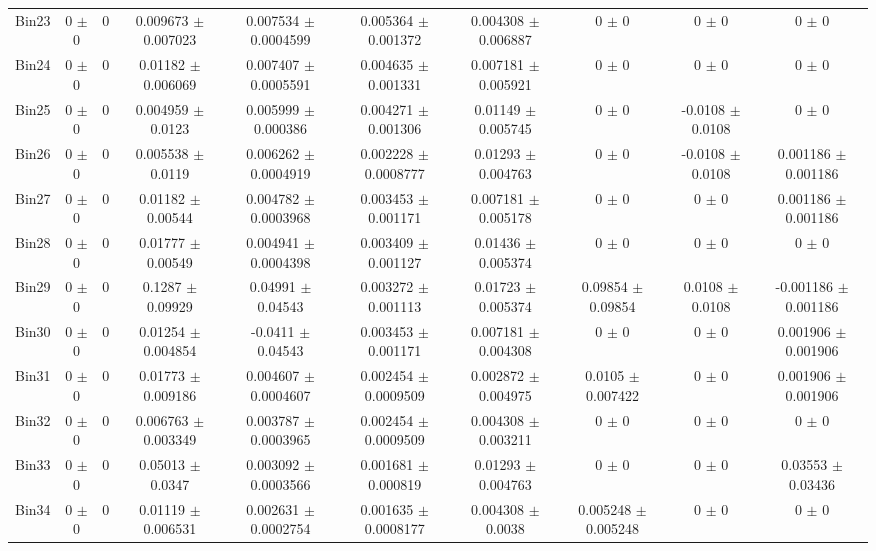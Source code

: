 \begin{tabular}{@{\extracolsep{4pt}}lccccccccc@{}}
     Bin23 & 0 $\pm$ 0 & 0 & 0.009673 $\pm$ 0.007023 & 0.007534 $\pm$ 0.0004599 & 0.005364 $\pm$ 0.001372 & 0.004308 $\pm$ 0.006887 & 0 $\pm$ 0 & 0 $\pm$ 0 & 0 $\pm$ 0 \\ 
     Bin24 & 0 $\pm$ 0 & 0 & 0.01182 $\pm$ 0.006069 & 0.007407 $\pm$ 0.0005591 & 0.004635 $\pm$ 0.001331 & 0.007181 $\pm$ 0.005921 & 0 $\pm$ 0 & 0 $\pm$ 0 & 0 $\pm$ 0 \\ 
     Bin25 & 0 $\pm$ 0 & 0 & 0.004959 $\pm$ 0.0123 & 0.005999 $\pm$ 0.000386 & 0.004271 $\pm$ 0.001306 & 0.01149 $\pm$ 0.005745 & 0 $\pm$ 0 & -0.0108 $\pm$ 0.0108 & 0 $\pm$ 0 \\ 
     Bin26 & 0 $\pm$ 0 & 0 & 0.005538 $\pm$ 0.0119 & 0.006262 $\pm$ 0.0004919 & 0.002228 $\pm$ 0.0008777 & 0.01293 $\pm$ 0.004763 & 0 $\pm$ 0 & -0.0108 $\pm$ 0.0108 & 0.001186 $\pm$ 0.001186 \\ 
     Bin27 & 0 $\pm$ 0 & 0 & 0.01182 $\pm$ 0.00544 & 0.004782 $\pm$ 0.0003968 & 0.003453 $\pm$ 0.001171 & 0.007181 $\pm$ 0.005178 & 0 $\pm$ 0 & 0 $\pm$ 0 & 0.001186 $\pm$ 0.001186 \\ 
     Bin28 & 0 $\pm$ 0 & 0 & 0.01777 $\pm$ 0.00549 & 0.004941 $\pm$ 0.0004398 & 0.003409 $\pm$ 0.001127 & 0.01436 $\pm$ 0.005374 & 0 $\pm$ 0 & 0 $\pm$ 0 & 0 $\pm$ 0 \\ 
     Bin29 & 0 $\pm$ 0 & 0 & 0.1287 $\pm$ 0.09929 & 0.04991 $\pm$ 0.04543 & 0.003272 $\pm$ 0.001113 & 0.01723 $\pm$ 0.005374 & 0.09854 $\pm$ 0.09854 & 0.0108 $\pm$ 0.0108 & -0.001186 $\pm$ 0.001186 \\ 
     Bin30 & 0 $\pm$ 0 & 0 & 0.01254 $\pm$ 0.004854 & -0.0411 $\pm$ 0.04543 & 0.003453 $\pm$ 0.001171 & 0.007181 $\pm$ 0.004308 & 0 $\pm$ 0 & 0 $\pm$ 0 & 0.001906 $\pm$ 0.001906 \\ 
     Bin31 & 0 $\pm$ 0 & 0 & 0.01773 $\pm$ 0.009186 & 0.004607 $\pm$ 0.0004607 & 0.002454 $\pm$ 0.0009509 & 0.002872 $\pm$ 0.004975 & 0.0105 $\pm$ 0.007422 & 0 $\pm$ 0 & 0.001906 $\pm$ 0.001906 \\ 
     Bin32 & 0 $\pm$ 0 & 0 & 0.006763 $\pm$ 0.003349 & 0.003787 $\pm$ 0.0003965 & 0.002454 $\pm$ 0.0009509 & 0.004308 $\pm$ 0.003211 & 0 $\pm$ 0 & 0 $\pm$ 0 & 0 $\pm$ 0 \\ 
     Bin33 & 0 $\pm$ 0 & 0 & 0.05013 $\pm$ 0.0347 & 0.003092 $\pm$ 0.0003566 & 0.001681 $\pm$ 0.000819 & 0.01293 $\pm$ 0.004763 & 0 $\pm$ 0 & 0 $\pm$ 0 & 0.03553 $\pm$ 0.03436 \\ 
     Bin34 & 0 $\pm$ 0 & 0 & 0.01119 $\pm$ 0.006531 & 0.002631 $\pm$ 0.0002754 & 0.001635 $\pm$ 0.0008177 & 0.004308 $\pm$ 0.0038 & 0.005248 $\pm$ 0.005248 & 0 $\pm$ 0 & 0 $\pm$ 0 \\ 

\end{tabular}
